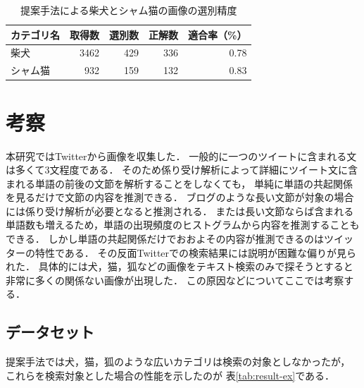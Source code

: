 \documentclass{deimj}
\begin{document}
\begin{table}[tb]
\begin{center}
\caption{提案手法による柴犬とシャム猫の画像の選別精度}
\label{tab:result-shiba}
\begin{tabular}{|l|r|r|r|r|}\hline
カテゴリ名& 取得数& 選別数& 正解数& 適合率（\%） \\ \hline \hline

柴犬& 3462& 429& 336& 0.78 \\ \hline
シャム猫& 932& 159& 132& 0.83 \\ \hline
\end{tabular}
\end{center}
\end{table}

\section{考察}
\label{sec:examination}

本研究ではTwitterから画像を収集した．
一般的に一つのツイートに含まれる文は多くて3文程度である．
そのため係り受け解析によって詳細にツイート文に含まれる単語の前後の文節を解析することをしなくても，
単純に単語の共起関係を見るだけで文節の内容を推測できる．
ブログのような長い文節が対象の場合には係り受け解析が必要となると推測される．
または長い文節ならば含まれる単語数も増えるため，単語の出現頻度のヒストグラムから内容を推測することもできる．
しかし単語の共起関係だけでおおよその内容が推測できるのはツイッターの特性である．
その反面Twitterでの検索結果には説明が困難な偏りが見られた．
具体的には犬，猫，狐などの画像をテキスト検索のみで探そうとすると非常に多くの関係ない画像が出現した．
この原因などについてここでは考察する．



\subsection{データセット}

提案手法では犬，猫，狐のような広いカテゴリは検索の対象としなかったが，
これらを検索対象とした場合の性能を示したのが
表\ref{tab:result-ex}である．
\end{document}
